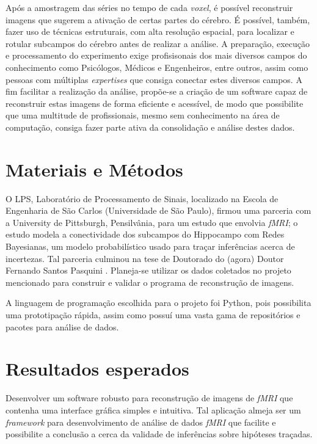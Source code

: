 \documentclass[11pt,a4paper]{report}
\begin{document}
Após a amostragem das séries no tempo de cada \emph{voxel}, é possível reconstruir imagens que sugerem a ativação de certas partes do cérebro. É possível, também, fazer uso de técnicas estruturais, com alta resolução espacial, para localizar e rotular subcampos do cérebro antes de realizar a análise. A preparação, execução e processamento do experimento exige profisisonais dos mais diversos campos do conhecimento como Psicólogos, Médicos e Engenheiros, entre outros, assim como pessoas com múltiplas \emph{expertises} que consiga conectar estes diversos campos. A fim facilitar a realização da análise, propõe-se a criação de um software capaz de reconstruir estas imagens de forma eficiente e acessível, de modo que possibilite que uma multitude de profissionais, mesmo sem conhecimento na área de computação, consiga fazer parte ativa da consolidação e análise destes dados.

\section*{Materiais e Métodos}

O LPS, Laboratório de Processamento de Sinais, localizado na Escola de Engenharia de São Carlos (Universidade de São Paulo), firmou uma parceria com a University de Pittsburgh, Pensilvânia, para um estudo que envolvia \emph{fMRI}; o estudo modela a conectividade dos subcampos do Hippocampo com Redes Bayesianas, um modelo probabilístico usado para traçar inferências acerca de incertezas. Tal parceria culminou na tese de Doutorado do (agora) Doutor Fernando Santos Pasquini \cite{Santos2017}. Planeja-se utilizar os dados coletados no projeto mencionado para construir e validar o programa de reconstrução de imagens.

A linguagem de programação escolhida para o projeto foi Python, pois possibilita uma prototipação rápida, assim como possuí uma vasta gama de repositórios e pacotes para análise de dados.

\section*{Resultados esperados}
Desenvolver um software robusto para reconstrução de imagens de \emph{fMRI} que contenha uma interface gráfica simples e intuitiva. Tal aplicação almeja ser um \emph{framework} para desenvolvimento de análise de dados \emph{fMRI} que facilite e possibilite a conclusão a cerca da validade de inferências sobre hipóteses traçadas.



\end{document}
